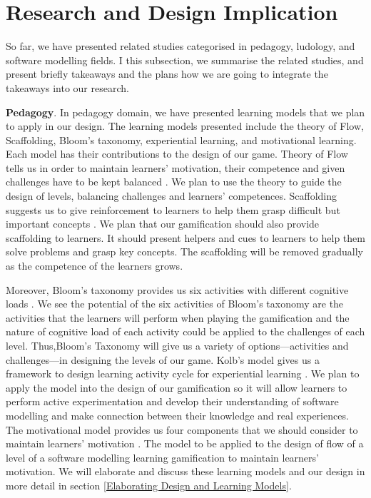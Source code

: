 \documentclass[12pt, a4paper]{report}
\begin{document}
{\section{Research and Design Implication}
\label{Research and Design Implication}
So far, we have presented related studies categorised in pedagogy, ludology, and software modelling fields. I this subsection, we summarise the related studies, and present briefly takeaways and the plans how we are going to integrate the takeaways into our research.     

\textbf{Pedagogy}. In pedagogy domain, we have presented learning models that we plan to apply in our design. The learning models presented include the theory of Flow, Scaffolding, Bloom's taxonomy, experiential learning, and motivational learning. Each model has their contributions to the design of our game. Theory of Flow tells us in order to maintain learners' motivation, their competence and given challenges have to be kept balanced \cite{csikszentmihalyi2014toward}. We plan to use the theory to guide the design of levels, balancing challenges and learners' competences. Scaffolding suggests us to give reinforcement to learners to help them grasp difficult but important concepts \cite{wood1976role, vygotsky1978mind}. We plan that our gamification should also provide scaffolding to learners. It should present helpers and cues to learners to help them solve problems and grasp key concepts. The scaffolding will be removed gradually as the competence of the learners grows. 

Moreover, Bloom's taxonomy provides us six activities with different cognitive loads \cite{krathwohl2002revision}. We see the potential of the six activities of Bloom’s taxonomy are the activities that the learners will perform when playing the gamification and the nature of cognitive load of each activity could be applied to the challenges of each level. Thus,Bloom's Taxonomy will give us a variety of options---activities and challenges---in designing the levels of our game. Kolb's model gives us a framework to design learning activity cycle for experiential learning \cite{kolb2014experiential}. We plan to apply the model into the design of our gamification so it will allow learners to perform active experimentation and develop their understanding of software modelling and make connection between their knowledge and real experiences. The motivational model provides us four components that we should consider to maintain learners' motivation \cite{keller2010motivational}. The model to be applied to the design of flow of a level of a software modelling learning gamification to maintain learners' motivation. We will elaborate and discuss these learning models and our design in more detail in section \ref{Elaborating Design and Learning Models}. 

}
\end{document}
